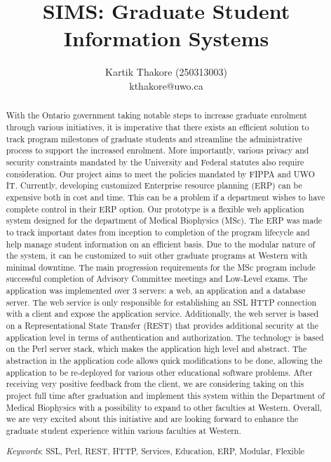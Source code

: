 \documentclass{journal}
\newcommand{\Keywords}[1]{\par\noindent
{\small{\em Keywords\/}: #1}}
\begin{document}

\nocite{*}
\title{SIMS: Graduate Student Information Systems}
\author{Kartik Thakore (250313003)\\kthakore@uwo.ca}
\maketitle

\begin{abstract}
With the Ontario government taking notable steps to increase
graduate enrolment through various initiatives, it is imperative that there exists an efficient
solution to track program milestones of graduate students and streamline the administrative
process to support the increased enrolment. More importantly, various privacy and security constraints
mandated by the University and Federal statutes also require consideration. Our project aims to meet the policies
mandated by FIPPA and UWO IT. Currently, developing customized Enterprise resource planning (ERP) can be expensive both in cost 
and time. This can be a problem if a department wishes to have complete control in their ERP option. Our prototype is a flexible web application 
system designed for the department of Medical Biophysics (MSc). The ERP was made
to track important dates from inception to completion of the program lifecycle and help manage
student information on an efficient basis. Due to the modular nature of the system, it can be
customized to suit other graduate programs at Western with minimal downtime. The main progression
requirements for the MSc program include successful completion of Advisory Committee
meetings and Low-Level exams. The application was implemented over 3 servers: a web, an application and a database server.
The web service is only responsible for establishing an SSL HTTP connection with a client and expose the application service.  
Additionally, the web server is based on a Representational State Transfer (REST) that provides additional security at the application level in terms of authentication and authorization. 
The technology is based on the Perl server stack, which makes the application high level and abstract. The abstraction in the application code
allows quick modifications to be done, allowing the application to be re-deployed for various other educational software problems. 
After receiving very positive feedback from the client, we are considering taking on this project full
time after graduation and implement this system within the Department of Medical Biophysics
with a possibility to expand to other faculties at Western. Overall, we are very excited about this
initiative and are looking forward to enhance the graduate student experience within various
faculties at Western.
\Keywords{ SSL, Perl, REST, HTTP, Services, Education, ERP, Modular, Flexible}
\end{abstract}\newpage
\end{document}
